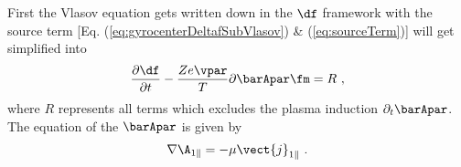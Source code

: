 First the Vlasov equation gets written down in the $\df$ framework with the source term [Eq. (\ref{eq:gyrocenterDeltafSubVlasov}) \& (\ref{eq:sourceTerm})] will get simplified into 
\begin{gather}
    \frac{\partial \df}{\partial t} - \frac{Ze \vpar}{T} \partial \barApar \fm = R~,
    \label{eq:gyrocenterDeltafSubVlasovReduced}
\end{gather}
where $R$ represents all terms which excludes the plasma induction $\partial_t \barApar$. The equation of the $\barApar$ is given by 
\begin{gather}
    \nabla \A_{1 \parallel} = - \mu \vect{j}_{1\parallel} ~.
    \label{eq:Aparallel}
\end{gather}

